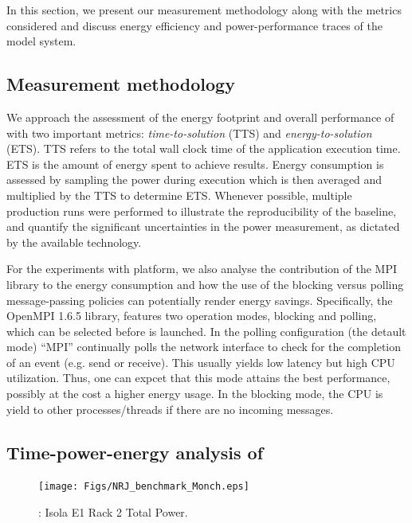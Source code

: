 In this section, we present our measurement methodology along with the
metrics considered and discuss energy efficiency and power-performance
traces of the model system.

\subsection{Measurement methodology}
\label{subsec:4.1}

We  approach  the  assessment  of  the energy  footprint  and  overall
performance   of   \cosmoart   with  two   important  metrics:
\textit{time-to-solution} (TTS) and \textit{energy-to-solution} (ETS).
TTS refers to  the total wall clock time  of the application execution
time. ETS  is the amount of  energy spent to  achieve results.  Energy
consumption  is  assessed by  sampling  the  power during execution which is then averaged and multiplied  by the TTS to determine  ETS. Whenever  possible,  multiple production  runs  were
performed  to  illustrate the  reproducibility  of  the baseline,  and
quantify the  significant uncertainties  in the power  measurement, as
dictated by the available technology.

For the experiments with \tinto platform, we also analyse the contribution of the MPI library to the energy consumption and how the use of the blocking versus polling message-passing policies can potentially render energy savings. Specifically, the OpenMPI 1.6.5 library, 
features two operation modes, blocking and polling, which can be selected before \cosmoart
is launched. In the polling configuration (the detault mode) ``MPI'' continually polls
the network interface to check for the completion of an event (e.g. send or receive).
This usually yields low latency but high CPU utilization. Thus, one can expcet that this mode 
attains the best performance, possibly at the cost a higher energy usage. In the blocking
mode, the CPU is yield to other processes/threads if there are no incoming messages.

\subsection{Time-power-energy analysis of \cosmoart}
\label{subsec:4.2}

\begin{figure}[htbf]
  \begin{center}
    \texttt{[image: Figs/NRJ\_benchmark\_Monch.eps]}
    \caption{\monch: Isola E1 Rack 2 Total Power.}
    \label{fig:1}
  \end{center}
\end{figure}

